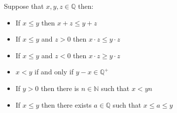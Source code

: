 \documentclass{tufte-handout}
\begin{document}
\begin{theorem}
	Suppose that $x, y, z \in \mathbb{Q}$ then:
	\begin{itemize}
		\item If $x \le y$ then $x + z \le y + z$
		\item If $x \le y$ and $z > 0$ then $x \cdot z \le y \cdot z$
		\item If $x \le y$ and $z < 0$ then $x \cdot z \ge y \cdot z$
		\item $x < y$ if and only if $y - x \in \mathbb{Q}^+$
		\item If $y > 0$ then there is $n \in \mathbb{N}$ such that $x < yn$
		\item If $x \le y$ then there exists $a \in \mathbb{Q}$ such that $x \le a \le y$
	\end{itemize}
\end{theorem}
\end{document}
